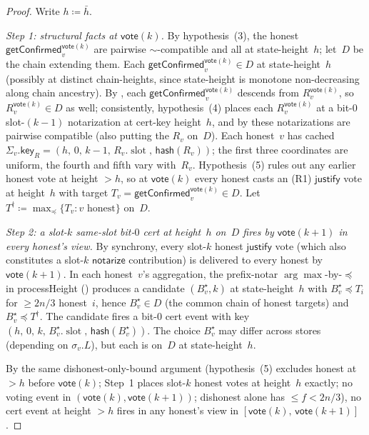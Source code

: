 \documentclass{article}
\newcommand{\slot}[0]{\ensuremath{\operatorname{\mathrm{slot}}}}
\newcommand{\just}{\ensuremath{\mathsf{justify}}\xspace}
\newcommand{\notar}{\ensuremath{\mathsf{notarize}}\xspace}
\newcommand{\hash}{\mathsf{hash}}
\newcommand{\key}{\mathsf{key}}
\newcommand{\vote}{\mathsf{vote}}
\newcommand{\comm}[1]{\bar{#1}}
\newcommand{\processHeight}{\textsf{processHeight}\xspace}
\newcommand{\getConfirmed}{\textsf{getConfirmed}\xspace}
\theoremstyle{plain}
\theoremstyle{definition}
\theoremstyle{remark}
\begin{document}
\begin{proof}
Write $h \coloneqq \comm{h}$.

\emph{Step 1: structural facts at $\vote(k)$.}
By hypothesis~(3), the honest $\getConfirmed_v^{\vote(k)}$ are pairwise $\sim$-compatible and all at state-height~$h$; let~$D$ be the chain extending them. Each $\getConfirmed_v^{\vote(k)} \in D$ at state-height~$h$ (possibly at distinct chain-heights, since state-height is monotone non-decreasing along chain ancestry).
By , each $\getConfirmed_v^{\vote(k)}$ descends from $R_v^{\vote(k)}$, so $R_v^{\vote(k)} \in D$ as well; consistently, hypothesis~(4) places each $R_v^{\vote(k)}$ at a bit-$0$ slot-$(k-1)$ notarization at cert-key height~$h$, and by  these notarizations are pairwise compatible (also putting the $R_v$ on~$D$). Each honest~$v$ has cached $\Sigma_v.\key_R = (h,\, 0,\, k-1,\, R_v.\slot,\, \hash(R_v))$; the first three coordinates are uniform, the fourth and fifth vary with~$R_v$.
Hypothesis~(5) rules out any earlier honest vote at height $>h$, so at $\vote(k)$ every honest casts an (R1) \just vote at height~$h$ with target $T_v = \getConfirmed_v^{\vote(k)} \in D$. Let $T^\dagger \coloneqq \max_\preceq \{T_v : v \text{ honest}\}$ on~$D$.

\emph{Step 2: a slot-$k$ same-slot bit-$0$ cert at height~$h$ on~$D$ fires by $\vote(k+1)$ in every honest's view.}
By synchrony, every slot-$k$ honest \just vote (which also constitutes a slot-$k$ \notar contribution) is delivered to every honest by $\vote(k+1)$. In each honest~$v$'s aggregation, the prefix-notar $\arg\max$-by-$\preceq$ in \processHeight{} () produces a candidate $(B^\star_v, k)$ at state-height~$h$ with $B^\star_v \preceq T_i$ for $\geq 2n/3$ honest~$i$, hence $B^\star_v \in D$ (the common chain of honest targets) and $B^\star_v \preceq T^\dagger$. The candidate fires a bit-$0$ cert event with key $(h,\, 0,\, k,\, B^\star_v.\slot,\, \hash(B^\star_v))$. The choice $B^\star_v$ may differ across stores (depending on $\sigma_v.L$), but each is on~$D$ at state-height~$h$.

By the same dishonest-only-bound argument (hypothesis~(5) excludes honest at $>h$ before $\vote(k)$; Step~1 places slot-$k$ honest votes at height~$h$ exactly; no voting event in $(\vote(k), \vote(k+1))$; dishonest alone has $\leq f < 2n/3$), no cert event at height $>h$ fires in any honest's view in $[\vote(k),\, \vote(k+1)]$.


\end{proof}
\end{document}
